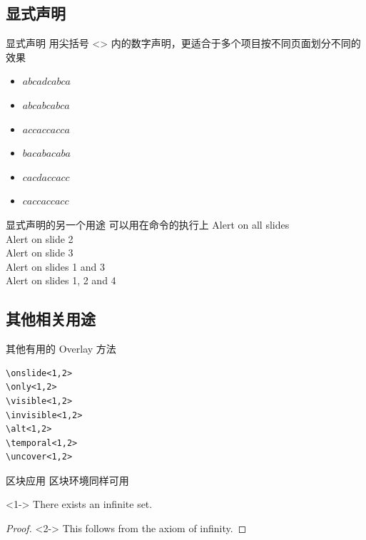 \documentclass[UTF8,14pt,aspectratio=43,dvipsnames,svgnames,x11names,hyperref={urlcolor=blue}]{beamer}
\begin{document}
\subsection[显式声明]{显式声明}
\begin{frame}{显式声明}
	用尖括号 <> 内的数字声明，更适合于多个项目按不同页面划分不同的效果
	\begin{itemize}[<+->]  %
		\item<1> $abcadcabca$\\
		\item<1-2> $abcabcabca$\\
		\item<1-2> $accaccacca$\\
		\item<1> $bacabacaba$\\
		\item<1,3> $cacdaccacc$\\
		\item<1-2> $caccaccacc$
	\end{itemize}
\end{frame}

\begin{frame}{显式声明的另一个用途}
	可以用在命令的执行上  %
	\vskip12pt
	\alert{Alert on all slides}\\
	\alert<2>{Alert on slide 2}\\
	\alert<3>{Alert on slide 3}\\
	\alert<1,3>{Alert on slides 1 and 3}\\
	\alert<-2,4>{Alert on slides 1, 2 and 4}
\end{frame}

\subsection[其他相关用途]{其他相关用途}
\begin{frame}[fragile]{其他有用的 Overlay 方法}
	\begin{verbatim}
\onslide<1,2>
\only<1,2> 
\visible<1,2>
\invisible<1,2>
\alt<1,2> 
\temporal<1,2>
\uncover<1,2> 
\end{verbatim}
\end{frame}

\begin{frame}{区块应用}
	区块环境同样可用
	\begin{theorem}<1->
		There exists an infinite set.
	\end{theorem}
	\begin{proof}<2->
		This follows from the axiom of infinity.
	\end{proof}
\end{frame}
\end{document}
